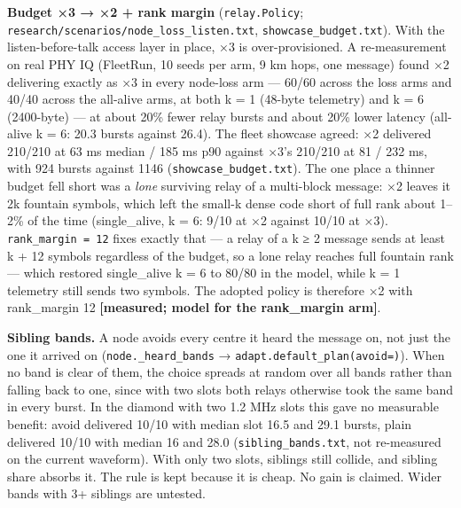 \documentclass[10pt,letterpaper,twocolumn]{article}
\begin{document}
\textbf{Budget ×3 → ×2 + rank margin} (\texttt{relay.\allowbreak{}Policy}; \texttt{research/\allowbreak{}scenarios/\allowbreak{}node\_\allowbreak{}loss\_\allowbreak{}listen.\allowbreak{}txt}, \texttt{showcase\_\allowbreak{}budget.\allowbreak{}txt}). With the listen-before-talk access layer in place, ×3 is over-provisioned. A re-measurement on real PHY IQ (FleetRun, 10 seeds per arm, 9 km hops, one message) found ×2 delivering exactly as ×3 in every node-loss arm --- 60/60 across the loss arms and 40/40 across the all-alive arms, at both k = 1 (48-byte telemetry) and k = 6 (2400-byte) --- at about 20\% fewer relay bursts and about 20\% lower latency (all-alive k = 6: 20.3 bursts against 26.4). The fleet showcase agreed: ×2 delivered 210/210 at 63 ms median / 185 ms p90 against ×3's 210/210 at 81 / 232 ms, with 924 bursts against 1146 (\texttt{showcase\_\allowbreak{}budget.\allowbreak{}txt}). The one place a thinner budget fell short was a \emph{lone} surviving relay of a multi-block message: ×2 leaves it 2k fountain symbols, which left the small-k dense code short of full rank about 1--2\% of the time (single\_alive, k = 6: 9/10 at ×2 against 10/10 at ×3). \texttt{rank\_\allowbreak{}margin\ =\allowbreak{}\ 12} fixes exactly that --- a relay of a k ≥ 2 message sends at least k + 12 symbols regardless of the budget, so a lone relay reaches full fountain rank --- which restored single\_alive k = 6 to 80/80 in the model, while k = 1 telemetry still sends two symbols. The adopted policy is therefore ×2 with rank\_margin 12 \textbf{{[}measured; model for the rank\_margin arm{]}}.

\textbf{Sibling bands.} A node avoids every centre it heard the message on, not just the one it arrived on (\texttt{node.\allowbreak{}\_\allowbreak{}heard\_\allowbreak{}bands} → \texttt{adapt.\allowbreak{}default\_\allowbreak{}plan(\allowbreak{}avoid=\allowbreak{})\allowbreak{}}). When no band is clear of them, the choice spreads at random over all bands rather than falling back to one, since with two slots both relays otherwise took the same band in every burst. In the diamond with two 1.2 MHz slots this gave no measurable benefit: avoid delivered 10/10 with median slot 16.5 and 29.1 bursts, plain delivered 10/10 with median 16 and 28.0 (\texttt{sibling\_\allowbreak{}bands.\allowbreak{}txt}, not re-measured on the current waveform). With only two slots, siblings still collide, and sibling share absorbs it. The rule is kept because it is cheap. No gain is claimed. Wider bands with 3+ siblings are untested.
\end{document}
